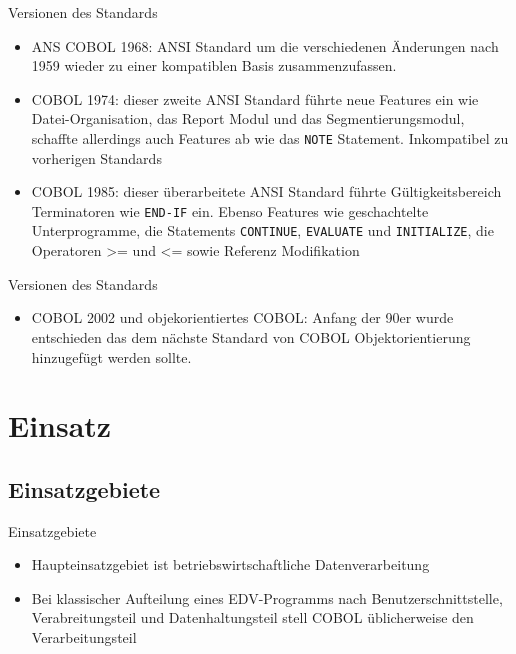 \documentclass{beamer}
\begin{document}
\begin{frame}{Versionen des Standards}
	\begin{itemize}
		\item
			ANS COBOL 1968: ANSI Standard um die verschiedenen \"Anderungen nach 1959 wieder zu einer kompatiblen Basis zusammenzufassen.
		\item
			COBOL 1974: dieser zweite ANSI Standard f\"uhrte neue Features ein wie Datei-Organisation, das Report Modul und das Segmentierungsmodul, schaffte allerdings auch Features ab wie das \texttt{NOTE} Statement. Inkompatibel zu vorherigen Standards
		\item
			COBOL 1985: dieser \"uberarbeitete ANSI Standard f\"uhrte G\"ultigkeitsbereich Terminatoren wie \texttt{END-IF} ein. Ebenso Features wie geschachtelte Unterprogramme, die Statements \texttt{CONTINUE}, \texttt{EVALUATE} und \texttt{INITIALIZE}, die Operatoren >= und <= sowie Referenz Modifikation
	\end{itemize}
\end{frame}

\begin{frame}{Versionen des Standards}
		\begin{itemize}
			\item
				COBOL 2002 und objekorientiertes COBOL: Anfang der 90er wurde entschieden das dem n\"achste Standard von COBOL Objektorientierung hinzugef\"ugt werden sollte.
		\end{itemize}
\end{frame}

\section{Einsatz}

\subsection{Einsatzgebiete}

\begin{frame}{Einsatzgebiete}
	\begin{itemize}
		\item
			Haupteinsatzgebiet ist betriebswirtschaftliche Datenverarbeitung
		\item
			Bei klassischer Aufteilung eines EDV-Programms nach Benutzerschnittstelle, Verabreitungsteil und Datenhaltungsteil stell COBOL \"ublicherweise den Verarbeitungsteil
	\end{itemize}
\end{frame}
\end{document}
